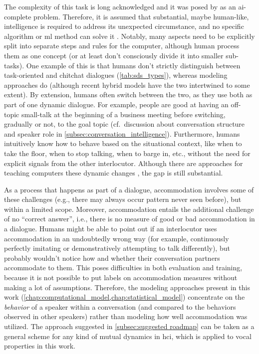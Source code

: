 The complexity of this task is long acknowledged and it was posed by \citet{Turing1950computing} as an \acs{ai}-complete problem.
Therefore, it is assumed that substantial, maybe human-like, intelligence is required to address its unexpected circumstance, and no specific algorithm or \ac{ml} method can solve it \citep[see further reasoning and examples in][pp.~54-57]{Shapiro1992encyclopedia}.
Notably, many aspects need to be explicitly split into separate steps and rules for the computer, although human process them as one concept (or at least don't consciously divide it into smaller sub-tasks).
One example of this is that humans don't strictly distinguish between task-oriented and chitchat dialogues (\cref{tab:sds_types}), whereas modeling approaches do (although recent hybrid models have the two intertwined to some extent).
By extension, humans often switch between the two, as they use both as part of one dynamic dialogue.
For example, people are good at having an off-topic small-talk at the beginning of a business meeting before switching, gradually or not, to the goal topic (cf.\ discussion about conversation structure and speaker role in \cref{subsec:conversation_intelligence}).
Furthermore, humans intuitively know how to behave based on the situational context, like when to take the floor, when to stop talking, when to barge in, etc., without the need for explicit signals from the other interlocutor.
Although there are approaches for teaching computers these dynamic changes \citep[e.g.,][]{Skantze2009incremental}, the gap is still substantial.

As a process that happens as part of a dialogue, accommodation involves some of these challenges (e.g., there may always occur pattern never seen before), but within a limited scope.
Moreover, accommodation entails the additional challenge of no \enquote{correct answer}, i.e., there is no measure of good or bad accommodation in a dialogue.
Humans might be able to point out if an interlocutor uses accommodation in an undoubtedly wrong way (for example, continuously perfectly imitating or demonstratively attempting to talk differently), but probably wouldn't notice how and whether their conversation partners accommodate to them.
This poses difficulties in both evaluation and training, because it is not possible to put labels on accommodation measures without making a lot of assumptions.
Therefore, the modeling approaches present in this work (\cref{chap:computational_model,chap:statistical_model}) concentrate on the \emph{behavior} of a speaker within a conversation (and compared to the behaviors observed in other speakers) rather than modeling how well accommodation was utilized.
The approach suggested in \cref{subsec:suggested roadmap} can be taken as a general scheme for any kind of mutual dynamics in \ac{hci}, which is applied to vocal properties in this work.

